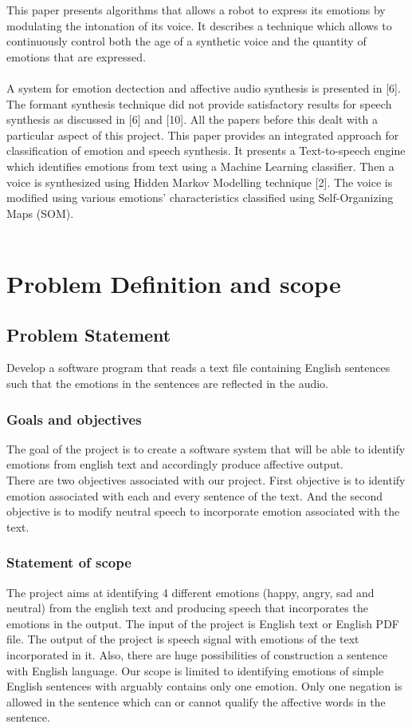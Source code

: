 \documentclass[oneside,a4paper,12pt]{book}
\begin{document}
	This paper presents algorithms that allows a robot to express its emotions by modulating the intonation of its voice. It describes a technique
	which allows to continuously control both the age of a synthetic voice and the quantity of emotions that are expressed.\\\\
	A system for emotion dectection and affective audio synthesis is presented in [6]. The formant synthesis technique did not provide satisfactory results for
	speech synthesis as discussed in [6] and [10]. All the papers before this dealt with a particular aspect of this project. This paper provides an integrated approach
	for classification of emotion and speech synthesis. It presents a Text-to-speech engine which identifies emotions from text
	using a Machine Learning classifier. Then a voice is synthesized using Hidden Markov Modelling technique [2]. The voice is modified
	using various emotions' characteristics classified using Self-Organizing Maps (SOM).\\\\


\chapter{Problem Definition and scope}
\section{Problem Statement}
Develop a software program that reads a text file containing English sentences such that the emotions in the sentences are reflected in the audio.


\subsection{Goals and objectives}  
The goal of the project is to create a software system that will be able to identify emotions from english text and accordingly produce affective output.\\
There are two objectives associated with our project. First objective is to identify emotion associated with each and every sentence of the text. And the second objective is to modify neutral speech to incorporate emotion associated with the text.

 \subsection{Statement of scope}
 	The project aims at identifying 4 different emotions (happy, angry, sad and neutral) from the english text and producing speech that incorporates the emotions in the output. The input of the project is English text or English PDF file. The output of the project is speech signal with emotions of the text incorporated in it. Also, there are huge possibilities of construction a sentence with English language. Our scope is limited to identifying emotions of simple English sentences with arguably contains only one emotion. Only one negation is allowed in the sentence which can or cannot qualify the affective words in the sentence.
\end{document}
